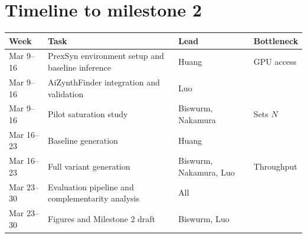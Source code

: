 \section*{Timeline to milestone 2}

\begin{table}[h]
\centering
\small
\begin{tabularx}{\textwidth}{p{2.0cm} X >{\raggedright\arraybackslash}p{3.5cm} p{2.0cm}}
\toprule
\textbf{Week} & \textbf{Task} & \textbf{Lead} & \textbf{Bottleneck} \\
\midrule
Mar 9--16 & PrexSyn environment setup and baseline inference & Huang & GPU access \\
Mar 9--16 & AiZynthFinder integration and validation & Luo & \\
Mar 9--16 & Pilot saturation study & Biswurm, Nakamura & Sets $N$ \\
\midrule
Mar 16--23 & Baseline generation & Huang & \\
Mar 16--23 & Full variant generation & Biswurm, Nakamura, Luo & Throughput \\
\midrule
Mar 23--30 & Evaluation pipeline and complementarity analysis & All & \\
Mar 23--30 & Figures and Milestone 2 draft & Biswurm, Luo & \\
\bottomrule
\end{tabularx}
\end{table}
